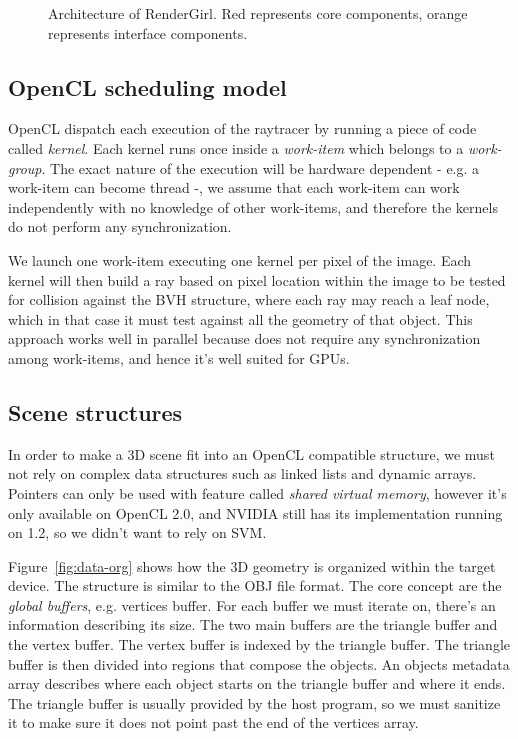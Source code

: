 \documentclass{vgtc}
\begin{document}
\begin{figure}
\centering

\caption{Architecture of RenderGirl. Red represents core components,
  orange represents interface components.}
\label{fig:architecture}
\end{figure}


\subsection{OpenCL scheduling model}

OpenCL dispatch each execution of the raytracer by running a piece of
code called \emph{kernel}. Each kernel runs once inside a
\emph{work-item} which belongs to a \emph{work-group}. The exact
nature of the execution will be hardware dependent - e.g. a work-item
can become thread -, we assume that each work-item can work
independently with no knowledge of other work-items, and therefore the
kernels do not perform any synchronization.

We launch one work-item executing one kernel per pixel of the
image. Each kernel will then build a ray based on pixel location
within the image to be tested for collision against the BVH structure,
where each ray may reach a leaf node, which in that case it must test
against all the geometry of that object. This approach works well in
parallel because does not require any synchronization among
work-items, and hence it's well suited for GPUs.


\subsection{Scene structures}

In order to make a 3D scene fit into an OpenCL compatible structure,
we must not rely on complex data structures such as linked lists and
dynamic arrays. Pointers can only be used with feature called
\emph{shared virtual memory}, however it's only available on OpenCL
2.0, and NVIDIA still has its implementation running on 1.2, so we
didn't want to rely on SVM.

Figure~\ref{fig:data-org} shows how the 3D geometry is organized
within the target device. The structure is similar to the OBJ file
format. The core concept are the \emph{global buffers}, e.g. vertices
buffer. For each buffer we must iterate on, there's an information
describing its size. The two main buffers are the triangle buffer and
the vertex buffer. The vertex buffer is indexed by the triangle
buffer. The triangle buffer is then divided into regions that compose
the objects. An objects metadata array describes where each object
starts on the triangle buffer and where it ends. The triangle buffer
is usually provided by the host program, so we must sanitize it to
make sure it does not point past the end of the vertices array.
\end{document}
